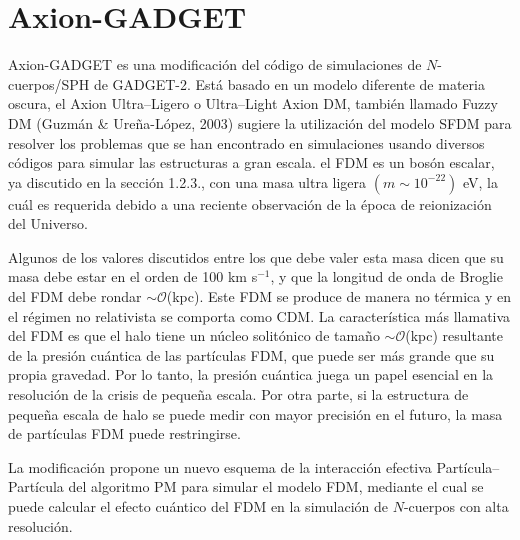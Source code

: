 \documentclass[a4paper,openright,12pt]{book}
\begin{document}
\section{Axion-GADGET}
Axion-GADGET \cite{3.1} es una modificación del código de simulaciones de $N$-cuerpos/SPH de GADGET-2. Está basado en un modelo diferente de materia oscura, el Axion Ultra--Ligero o Ultra--Light Axion DM, también llamado Fuzzy DM (Guzmán \& Ureña-López, 2003) sugiere la utilización del modelo SFDM para resolver los problemas que se han encontrado en simulaciones usando diversos códigos para simular las estructuras a gran escala. el FDM es un bosón escalar, ya discutido en la sección 1.2.3., con una masa ultra ligera $(m \sim 10^{-22})$ eV, la cuál es requerida debido a una reciente observación de la época de reionización del Universo. 

Algunos de los valores discutidos entre los que debe valer esta masa dicen que su masa debe estar en el orden de 100 km s$^{-1}$, y que la longitud de onda de Broglie del FDM debe rondar $\sim \mathcal{O}$(kpc). Este FDM se produce de manera no térmica y en el régimen no relativista se comporta como CDM. La característica más llamativa del FDM es que el halo tiene un núcleo solitónico de tamaño $\sim \mathcal{O} $(kpc) resultante de la presión cuántica de las partículas FDM, que puede ser más grande que su propia gravedad. Por lo tanto, la presión cuántica juega un papel esencial en la resolución de la crisis de pequeña escala. Por otra parte, si la estructura de pequeña escala de halo se puede medir con mayor precisión en el futuro, la masa de partículas FDM puede restringirse. 

La modificación propone un nuevo esquema de la interacción efectiva Partícula--Partícula del algoritmo PM para simular el modelo FDM, mediante el cual se puede calcular el efecto cuántico del FDM en la simulación de $N$-cuerpos con alta resolución.
\end{document}
